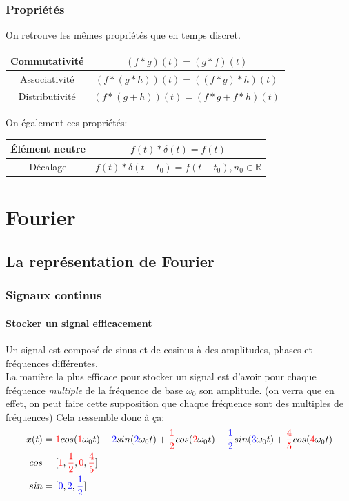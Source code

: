 \documentclass{report}
\begin{document}
\subsection{Propriétés}
On retrouve les mêmes propriétés que en temps discret.
\begin{center}
\begin{tabular}{c|c}
	Commutativité & $(f\ast g)(t) = (g \ast f)(t)$ \\
	\hline
	Associativité & $(f \ast (g \ast h))(t) = ((f \ast g) \ast h)(t)$ \\
	\hline
	Distributivité & $(f \ast (g + h))(t) = (f \ast g + f \ast h)(t)$ \\
\end{tabular}
\end{center}
On également ces propriétés:
\begin{center}
\begin{tabular}{c|c}
	Élément neutre & $f(t) \ast \delta(t) = f(t)$ \\
	\hline
	Décalage & $f(t) \ast \delta(t-t_0) = f(t-t_0), n_0 \in \mathbb{R}$ \\
\end{tabular}
\end{center}




\chapter{Fourier}
\section{La représentation de Fourier}

\subsection{Signaux continus}
\subsubsection{Stocker un signal efficacement}
Un signal est composé de sinus et de cosinus à des amplitudes, phases et fréquences différentes.\\
La manière la plus efficace pour stocker un signal est d'avoir pour chaque fréquence \textit{multiple} de la fréquence de base $\omega_0$ son amplitude. (on verra que en effet, on peut faire cette supposition que chaque fréquence sont des multiples de fréquences) Cela ressemble donc à ça:
\begin{align}
x(t) &= \textcolor{red}{1}cos(\textcolor{red}{1}\omega_0t) + \textcolor{blue}{2}sin(\textcolor{blue}{2}\omega_0t) + \textcolor{red}{\frac{1}{2}}cos(\textcolor{red}{2}\omega_0t) + \textcolor{blue}{\frac{1}{2}}sin(\textcolor{blue}{3}\omega_0t) +  \textcolor{red}{\frac{4}{5}}cos(\textcolor{red}{4}\omega_0t) \label{eq:signal}\\
cos &= [\textcolor{red}{1}, \textcolor{red}{\frac{1}{2}}, \textcolor{red}{0}, \textcolor{red}{\frac{4}{5}}]\\
sin &= [\textcolor{blue}{0}, \textcolor{blue}{2}, \textcolor{blue}{\frac{1}{2}}]
\end{align}
\end{document}
